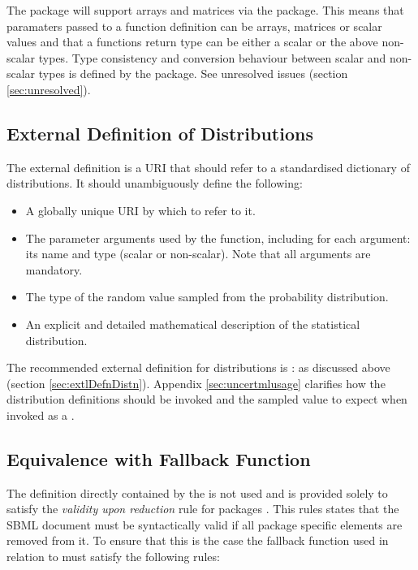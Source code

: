 \documentclass[draftspec]{sbmlpkgspec}
\begin{document}
The \distrib package will support arrays and matrices via the \arrays
package. This means that paramaters passed to a function definition
can be arrays, matrices or scalar values and that a functions return
type can be either a scalar or the above non-scalar types. Type
consistency and conversion behaviour between scalar and non-scalar
types is defined by the \arrays package. See unresolved issues
(section \ref{sec:unresolved}).

\subsection{External Definition of Distributions}
\label{sec:externaldistdef}

The external definition is a URI that should refer to a standardised
dictionary of distributions. It should unambiguously define the
following:

\begin{itemize}
\item A globally unique URI by which to refer to it.
\item The parameter arguments used by the function, including for each
 argument: its name and type (scalar or non-scalar). Note that all
 arguments are mandatory.
\item The type of the random value sampled from the probability distribution.
\item An explicit and detailed mathematical description of the statistical distribution.
\end{itemize}

The recommended external definition for distributions is \uncertml: as
discussed above (section \ref{sec:extlDefnDistn}). Appendix
\ref{sec:uncertmlusage} clarifies how the distribution definitions
should be invoked and the sampled value to expect when invoked as a
.

\subsection{Equivalence with Fallback Function}
\label{sec:fallbackfunc}

The \mathml definition directly contained by the
 is not used and is provided solely to
satisfy the \emph{validity upon reduction} rule for packages
\cite{sbmll3v1packrule}. This rules states that the SBML document must
be syntactically valid if all package specific elements are removed
from it. To ensure that this is the case the fallback function used in
relation to \distribshort must satisfy the following rules:
\end{document}
